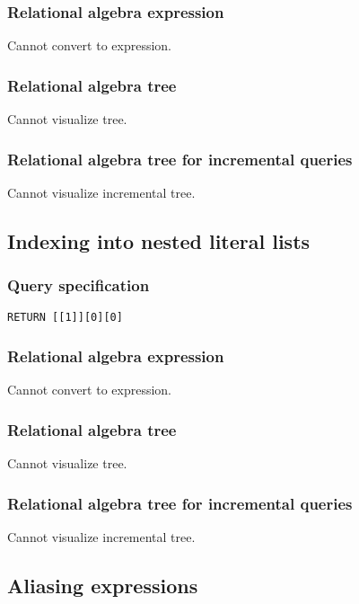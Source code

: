 \subsubsection*{Relational algebra expression}

Cannot convert to expression.

\subsubsection*{Relational algebra tree}

Cannot visualize tree.

\subsubsection*{Relational algebra tree for incremental queries}

Cannot visualize incremental tree.

\subsection{Indexing into nested literal lists}

\subsubsection*{Query specification}

\begin{lstlisting}
RETURN [[1]][0][0]
\end{lstlisting}

\subsubsection*{Relational algebra expression}

Cannot convert to expression.

\subsubsection*{Relational algebra tree}

Cannot visualize tree.

\subsubsection*{Relational algebra tree for incremental queries}

Cannot visualize incremental tree.

\subsection{Aliasing expressions}

